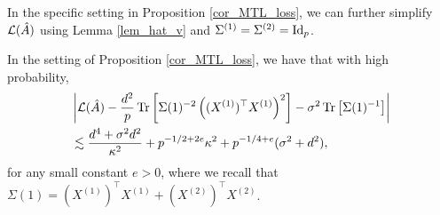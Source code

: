 In the specific setting in Proposition \ref{cor_MTL_loss}, we can further simplify $\cal L(\hat A)$ using Lemma \ref{lem_hat_v} and $\Sigma^{(1)}=\Sigma^{(2)}=\id_p$.
 
\begin{lemma}
In the setting of Proposition \ref{cor_MTL_loss}, we have that with high probability,
\begin{align}
&\left|\cal L(\hat A)-\frac{d^2}{p}\tr\left[\Sigma(1)^{-2} \left((X^{(1)})^\top X^{(1)} \right)^2\right] -\sigma^2  \bigtr{\Sigma(1)^{-1}  }\right| \nonumber\\
&\lesssim  \frac{d^4 + \sigma^2 d^2}{\kappa^2}+p^{-1/2+2e}\kappa^2 +  p^{-1/4+e} (\sigma^2 +d^2) , \label{simple1}
\end{align}
for any small constant $e>0$, where we recall that $\Sigma(1)= (X^{(1)})^\top X^{(1)}  + (X^{(2)})^\top X^{(2)}$.
\end{lemma}
